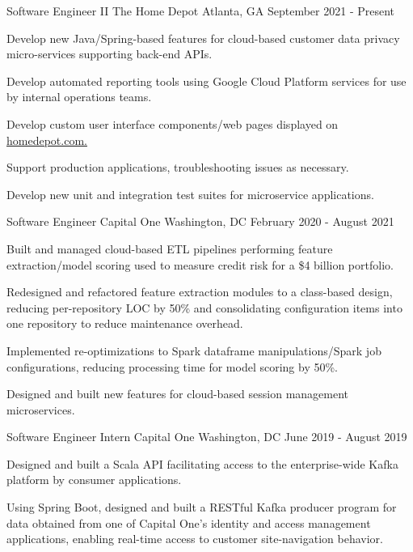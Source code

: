
\begin{cventries}
  \cventry
    {Software Engineer II} %
    {The Home Depot} %
    {Atlanta, GA} %
    {September 2021 - Present} %
    {
      \begin{cvitems} %
        \item {Develop new Java/Spring-based features for cloud-based customer data privacy micro-services supporting back-end APIs.}
        \item {Develop automated reporting tools using Google Cloud Platform services for use by internal operations teams.}
        \item {Develop custom user interface components/web pages displayed on \href{https://www.homedepot.com/privacy/mypreferencecenter}{homedepot.com.}}
        \item {Support production applications, troubleshooting issues as necessary.}
        \item {Develop new unit and integration test suites for microservice applications.}
      \end{cvitems}
    }

  \cventry
    {Software Engineer} %
    {Capital One} %
    {Washington, DC} %
    {February 2020 - August 2021} %
    {
      \begin{cvitems} %
        \item {Built and managed cloud-based ETL pipelines performing feature extraction/model
        scoring used to measure credit risk for a \$4 billion portfolio.}
        \item {Redesigned and refactored feature extraction modules to a class-based design, reducing
        per-repository LOC by 50\% and consolidating configuration items into one repository to reduce
        maintenance overhead.}
        \item {Implemented re-optimizations to Spark dataframe manipulations/Spark job configurations, reducing
        processing time for model scoring by 50\%.}
        \item {Designed and built new features for cloud-based session management microservices.}
      \end{cvitems}
    }

  \cventry
    {Software Engineer Intern} %
    {Capital One} %
    {Washington, DC} %
    {June 2019 - August 2019} %
    {
      \begin{cvitems} %
        \item {Designed and built a Scala API facilitating access to the enterprise-wide Kafka platform by
        consumer applications.}
        \item {Using Spring Boot, designed and built a RESTful Kafka producer program for data obtained from
        one of Capital One’s identity and access management applications, enabling real-time access
        to customer site-navigation behavior.}
      \end{cvitems}
    }


\end{cventries}
